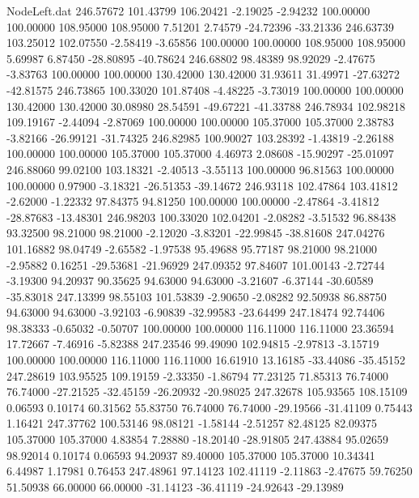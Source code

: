 \begin{filecontents}{NodeLeft.dat}
 246.57672  101.43799  106.20421    -2.19025   -2.94232  100.00000  100.00000  108.95000  108.95000    7.51201    2.74579  -24.72396  -33.21336
 246.63739  103.25012  102.07550    -2.58419   -3.65856  100.00000  100.00000  108.95000  108.95000    5.69987    6.87450  -28.80895  -40.78624
 246.68802   98.48389   98.92029    -2.47675   -3.83763  100.00000  100.00000  130.42000  130.42000   31.93611   31.49971  -27.63272  -42.81575
 246.73865  100.33020  101.87408    -4.48225   -3.73019  100.00000  100.00000  130.42000  130.42000   30.08980   28.54591  -49.67221  -41.33788
 246.78934  102.98218  109.19167    -2.44094   -2.87069  100.00000  100.00000  105.37000  105.37000    2.38783   -3.82166  -26.99121  -31.74325
 246.82985  100.90027  103.28392    -1.43819   -2.26188  100.00000  100.00000  105.37000  105.37000    4.46973    2.08608  -15.90297  -25.01097
 246.88060   99.02100  103.18321    -2.40513   -3.55113  100.00000   96.81563  100.00000  100.00000    0.97900   -3.18321  -26.51353  -39.14672
 246.93118  102.47864  103.41812    -2.62000   -1.22332   97.84375   94.81250  100.00000  100.00000   -2.47864   -3.41812  -28.87683  -13.48301
 246.98203  100.33020  102.04201    -2.08282   -3.51532   96.88438   93.32500   98.21000   98.21000   -2.12020   -3.83201  -22.99845  -38.81608
 247.04276  101.16882   98.04749    -2.65582   -1.97538   95.49688   95.77187   98.21000   98.21000   -2.95882    0.16251  -29.53681  -21.96929
 247.09352   97.84607  101.00143    -2.72744   -3.19300   94.20937   90.35625   94.63000   94.63000   -3.21607   -6.37144  -30.60589  -35.83018
 247.13399   98.55103  101.53839    -2.90650   -2.08282   92.50938   86.88750   94.63000   94.63000   -3.92103   -6.90839  -32.99583  -23.64499
 247.18474   92.74406   98.38333    -0.65032   -0.50707  100.00000  100.00000  116.11000  116.11000   23.36594   17.72667   -7.46916   -5.82388
 247.23546   99.49090  102.94815    -2.97813   -3.15719  100.00000  100.00000  116.11000  116.11000   16.61910   13.16185  -33.44086  -35.45152
 247.28619  103.95525  109.19159    -2.33350   -1.86794   77.23125   71.85313   76.74000   76.74000  -27.21525  -32.45159  -26.20932  -20.98025
 247.32678  105.93565  108.15109     0.06593    0.10174   60.31562   55.83750   76.74000   76.74000  -29.19566  -31.41109    0.75443    1.16421
 247.37762  100.53146   98.08121    -1.58144   -2.51257   82.48125   82.09375  105.37000  105.37000    4.83854    7.28880  -18.20140  -28.91805
 247.43884   95.02659   98.92014     0.10174    0.06593   94.20937   89.40000  105.37000  105.37000   10.34341    6.44987    1.17981    0.76453
 247.48961   97.14123  102.41119    -2.11863   -2.47675   59.76250   51.50938   66.00000   66.00000  -31.14123  -36.41119  -24.92643  -29.13989

\end{filecontents}
